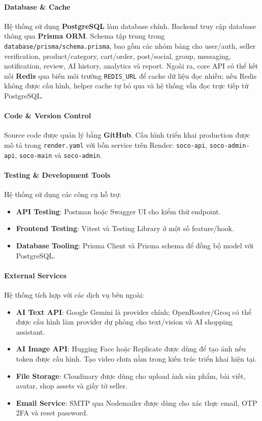 \paragraph{Database \& Cache} Hệ thống sử dụng \textbf{PostgreSQL} làm database chính. Backend truy cập database thông qua \textbf{Prisma ORM}. Schema tập trung trong \texttt{database/prisma/schema.prisma}, bao gồm các nhóm bảng cho user/auth, seller verification, product/category, cart/order, post/social, group, messaging, notification, review, AI history, analytics và report. Ngoài ra, core API có thể kết nối \textbf{Redis} qua biến môi trường \texttt{REDIS\_URL} để cache dữ liệu đọc nhiều; nếu Redis không được cấu hình, helper cache tự bỏ qua và hệ thống vẫn đọc trực tiếp từ PostgreSQL.

\paragraph{Code \& Version Control} Source code được quản lý bằng \textbf{GitHub}. Cấu hình triển khai production được mô tả trong \texttt{render.yaml} với bốn service trên Render: \texttt{soco-api}, \texttt{soco-admin-api}, \texttt{soco-main} và \texttt{soco-admin}.

\paragraph{Testing \& Development Tools} Hệ thống sử dụng các công cụ hỗ trợ:

\begin{itemize}
    \item \textbf{API Testing}: Postman hoặc Swagger UI cho kiểm thử endpoint.
    \item \textbf{Frontend Testing}: Vitest và Testing Library ở một số feature/hook.
    \item \textbf{Database Tooling}: Prisma Client và Prisma schema để đồng bộ model với PostgreSQL.
\end{itemize}

\paragraph{External Services} Hệ thống tích hợp với các dịch vụ bên ngoài:

\begin{itemize}
    \item \textbf{AI Text API}: Google Gemini là provider chính; OpenRouter/Groq có thể được cấu hình làm provider dự phòng cho text/vision và AI shopping assistant.
    \item \textbf{AI Image API}: Hugging Face hoặc Replicate được dùng để tạo ảnh nếu token được cấu hình. Tạo video chưa nằm trong kiến trúc triển khai hiện tại.
    \item \textbf{File Storage}: Cloudinary được dùng cho upload ảnh sản phẩm, bài viết, avatar, shop assets và giấy tờ seller.
    \item \textbf{Email Service}: SMTP qua Nodemailer được dùng cho xác thực email, OTP 2FA và reset password.
\end{itemize}
